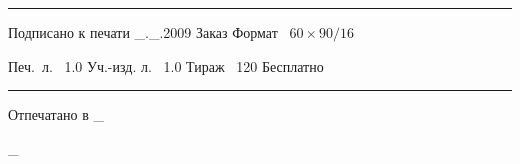 \documentclass[twoside,12pt]{article}
\begin{document}

\thispagestyle{empty}
\vfill
\footnotesize
\hrule
\medskip\noindent
Подписано к печати \_.\_.2009 \hskip 10mm
Заказ \hskip 28mm
Формат \ $60\times90/16$

\medskip\noindent
Печ.~л. \ 1.0 \hskip 16mm
Уч.-изд. л. \ 1.0 \hskip 16mm
Тираж \ 120 \hskip 16mm
Бесплатно
\medskip\hrule

\medskip\noindent
Отпечатано в \_

\medskip\noindent
\_
\end{document}
